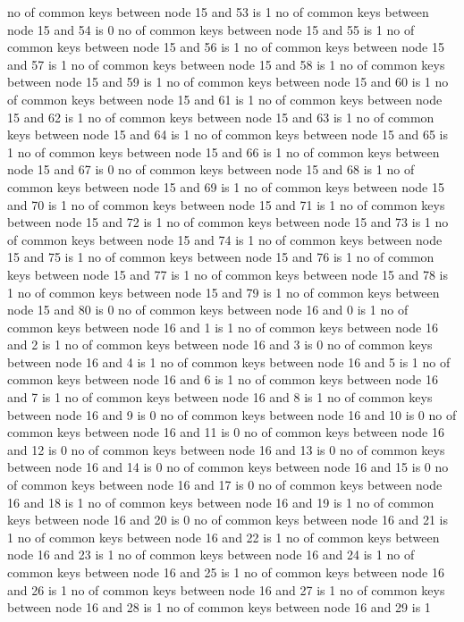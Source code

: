 no of common keys between node 15 and 53 is 1
no of common keys between node 15 and 54 is 0
no of common keys between node 15 and 55 is 1
no of common keys between node 15 and 56 is 1
no of common keys between node 15 and 57 is 1
no of common keys between node 15 and 58 is 1
no of common keys between node 15 and 59 is 1
no of common keys between node 15 and 60 is 1
no of common keys between node 15 and 61 is 1
no of common keys between node 15 and 62 is 1
no of common keys between node 15 and 63 is 1
no of common keys between node 15 and 64 is 1
no of common keys between node 15 and 65 is 1
no of common keys between node 15 and 66 is 1
no of common keys between node 15 and 67 is 0
no of common keys between node 15 and 68 is 1
no of common keys between node 15 and 69 is 1
no of common keys between node 15 and 70 is 1
no of common keys between node 15 and 71 is 1
no of common keys between node 15 and 72 is 1
no of common keys between node 15 and 73 is 1
no of common keys between node 15 and 74 is 1
no of common keys between node 15 and 75 is 1
no of common keys between node 15 and 76 is 1
no of common keys between node 15 and 77 is 1
no of common keys between node 15 and 78 is 1
no of common keys between node 15 and 79 is 1
no of common keys between node 15 and 80 is 0
no of common keys between node 16 and 0 is 1
no of common keys between node 16 and 1 is 1
no of common keys between node 16 and 2 is 1
no of common keys between node 16 and 3 is 0
no of common keys between node 16 and 4 is 1
no of common keys between node 16 and 5 is 1
no of common keys between node 16 and 6 is 1
no of common keys between node 16 and 7 is 1
no of common keys between node 16 and 8 is 1
no of common keys between node 16 and 9 is 0
no of common keys between node 16 and 10 is 0
no of common keys between node 16 and 11 is 0
no of common keys between node 16 and 12 is 0
no of common keys between node 16 and 13 is 0
no of common keys between node 16 and 14 is 0
no of common keys between node 16 and 15 is 0
no of common keys between node 16 and 17 is 0
no of common keys between node 16 and 18 is 1
no of common keys between node 16 and 19 is 1
no of common keys between node 16 and 20 is 0
no of common keys between node 16 and 21 is 1
no of common keys between node 16 and 22 is 1
no of common keys between node 16 and 23 is 1
no of common keys between node 16 and 24 is 1
no of common keys between node 16 and 25 is 1
no of common keys between node 16 and 26 is 1
no of common keys between node 16 and 27 is 1
no of common keys between node 16 and 28 is 1
no of common keys between node 16 and 29 is 1
